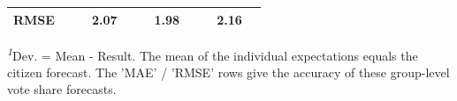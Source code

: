 \begin{table}[h!]
{\begin{minipage}{2\linewidth}
\begin{tabular*}{\linewidth}{@{\extracolsep{\fill}}lrrrrrrrrrr}
{\bfseries RMSE} & \multicolumn{1}{c}{{\bfseries }} & \multicolumn{1}{c}{{\bfseries }} & \multicolumn{1}{c}{{\bfseries 2.07}} & \multicolumn{1}{c}{{\bfseries }} & \multicolumn{1}{c}{{\bfseries }} & \multicolumn{1}{c}{{\bfseries 1.98}} & \multicolumn{1}{c}{{\bfseries }} & \multicolumn{1}{c}{{\bfseries }} & \multicolumn{1}{c}{{\bfseries 2.16}} & \multicolumn{1}{c}{{\bfseries }} \\ 
\bottomrule
\end{tabular*}
\begin{minipage}{\linewidth}
\vspace{.05em}
\textsuperscript{\textit{1}}Dev. = Mean - Result. The mean of the individual expectations equals the citizen forecast. The 'MAE' / 'RMSE' rows give the accuracy of these group-level vote share forecasts.\\
\end{minipage}
\end{minipage}%
}
\end{table}


